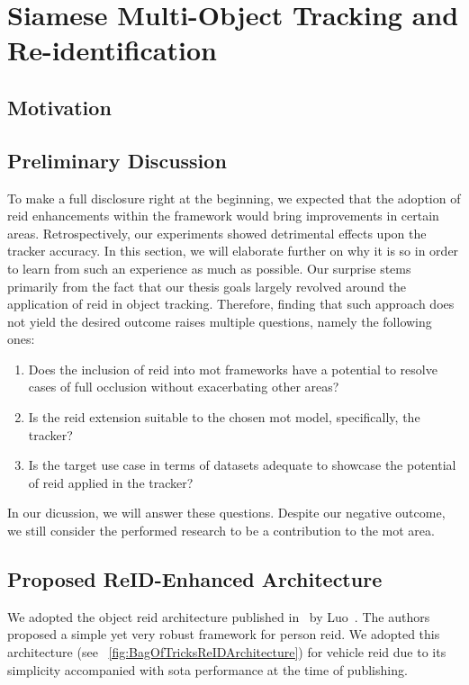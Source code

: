 \section{Siamese Multi-Object Tracking and Re-identification}
\label{sec:SiamMOTandReID}

\subsection{Motivation}

\subsection{Preliminary Discussion}

To make a full disclosure right at the beginning, we expected that the adoption of \gls{reid} enhancements within the \siammot{} framework would bring improvements in certain areas. Retrospectively, our experiments showed detrimental effects upon the tracker accuracy. In this section, we will elaborate further on why it is so in order to learn from such an experience as much as possible. Our surprise stems primarily from the fact that our thesis goals largely revolved around the application of \gls{reid} in object tracking. Therefore, finding that such approach does not yield the desired outcome raises multiple questions, namely the following ones:
\begin{enumerate}
    \item Does the inclusion of \gls{reid} into \gls{mot} frameworks have a potential to resolve cases of full occlusion without exacerbating other areas?
    \item Is the \gls{reid} extension suitable to the chosen \gls{mot} model, specifically, the \siammot{} tracker?
    \item Is the target use case in terms of datasets adequate to showcase the potential of \gls{reid} applied in the \siammot{} tracker?
\end{enumerate}
In our dicussion, we will answer these questions. Despite our negative outcome, we still consider the performed research to be a contribution to the \gls{mot} area.

\subsection{Proposed ReID-Enhanced Architecture}
\label{ssec:ProposedReIDEnhancedArchitecture}

We adopted the object \gls{reid} architecture published in~\cite{luo2019bagoftricksreid} by Luo~\etal{}. The authors proposed a simple yet very robust framework for person \gls{reid}. We adopted this architecture (see \figstr{}~\ref{fig:BagOfTricksReIDArchitecture}) for vehicle \gls{reid} due to its simplicity accompanied with \gls{sota} performance at the time of publishing.


